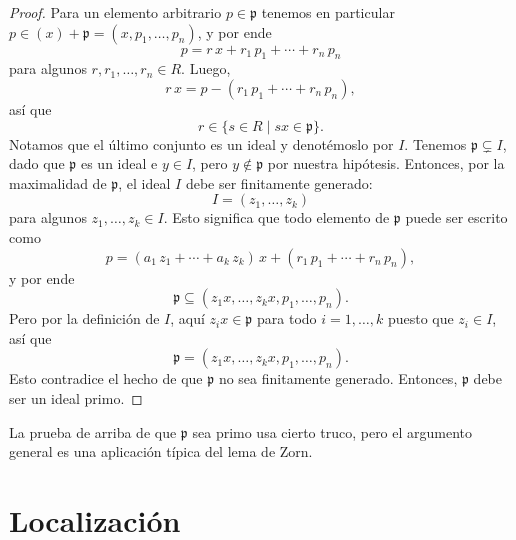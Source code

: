 \begin{teorema}[I.S. Cohen]
\begin{proof}
    Para un elemento arbitrario $p \in \mathfrak{p}$ tenemos en particular
    $p\in (x) + \mathfrak{p} = (x,p_1,\ldots,p_n)$, y por ende
    \begin{equation}
      \label{eqn:cohen-expresion-para-p}
      p = r\,x + r_1\,p_1 + \cdots + r_n\,p_n
    \end{equation}
    para algunos $r, r_1,\ldots,r_n \in R$. Luego,
    $$r\,x = p - (r_1\,p_1 + \cdots + r_n\,p_n),$$
    así que
    $$r \in \{ s\in R \mid sx \in \mathfrak{p} \}.$$
    Notamos que el último conjunto es un ideal y denotémoslo por $I$.
    Tenemos $\mathfrak{p} \subsetneq I$, dado que $\mathfrak{p}$ es un ideal e
    $y \in I$, pero $y \notin \mathfrak{p}$ por nuestra hipótesis. Entonces, por
    la maximalidad de $\mathfrak{p}$, el ideal $I$ debe ser finitamente
    generado:
    $$I = (z_1,\ldots,z_k)$$
    para algunos $z_1,\ldots,z_k \in I$. Esto significa que todo elemento de
    $\mathfrak{p}$ puede ser escrito como
    $$p = (a_1\,z_1 + \cdots + a_k\,z_k)\,x + (r_1\,p_1 + \cdots + r_n\,p_n),$$
    y por ende
    $$\mathfrak{p} \subseteq (z_1 x, \ldots, z_k x, p_1, \ldots, p_n).$$
    Pero por la definición de $I$, aquí $z_i x \in \mathfrak{p}$ para todo
    $i = 1,\ldots,k$ puesto que $z_i \in I$, así que
    $$\mathfrak{p} = (z_1 x, \ldots, z_k x, p_1, \ldots, p_n).$$
    Esto contradice el hecho de que $\mathfrak{p}$ no sea finitamente
    generado. Entonces, $\mathfrak{p}$ debe ser un ideal primo.
  \end{proof}
\end{teorema}

La prueba de arriba de que $\mathfrak{p}$ sea primo usa cierto truco, pero
el argumento general es una aplicación típica del lema de Zorn.


\section{Localización}

